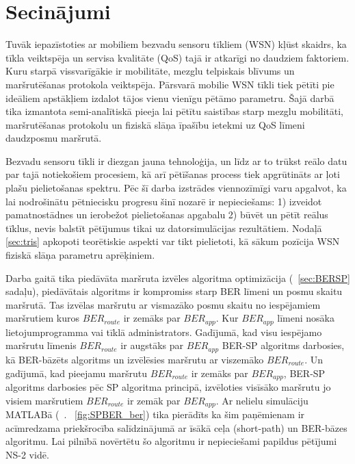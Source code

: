 \chapter{Secinājumi}\label{sec:secin}
Tuvāk iepazīstoties ar mobiliem bezvadu sensoru tīkliem (WSN) kļūst skaidrs, ka tīkla veiktspēja un servisa kvalitāte (QoS) tajā ir atkarīgi no daudziem faktoriem. Kuru starpā vissvarīgākie ir mobilitāte, mezglu telpiskais blīvums un maršrutēšanas protokola veiktspēja. Pārsvarā mobilie WSN tīkli tiek pētīti pie ideāliem apstākļiem izdalot tājos vienu vienīgu pētāmo parametru. Šajā darbā tika izmantota semi-analītiskā pieeja lai pētītu saistības starp mezglu mobilitāti, maršrutēšanas protokolu un fiziskā slāņa īpašību ietekmi uz QoS līmeni daudzposmu maršrutā.

Bezvadu sensoru tīkli ir diezgan jauna tehnoloģija, un līdz ar to trūkst reālo datu par tajā notiekošiem procesiem, kā arī pētīšanas process tiek apgrūtināts ar ļoti plašu pielietošanas spektru. Pēc šī darba izstrādes viennozīmīgi varu apgalvot, ka lai nodrošinātu pētniecisku progresu šinī nozarē ir nepieciešams: 1) izveidot pamatnostādnes un ierobežot pielietošanas apgabalu 2) būvēt un  pētīt reālus tīklus, nevis balstīt pētījumus tikai uz datorsimulācijas rezultātiem. Nodaļā \ref{sec:tris} apkopoti teorētiskie aspekti var tikt pielietoti, kā sākum pozīcija WSN fiziskā slāņa parametru aprēķiniem.

Darba gaitā tika piedāvāta maršruta izvēles algoritma optimizācija (\seename ~\ref{sec:BERSP} sadaļu), piedāvātais algoritms ir kompromiss starp BER līmeni un posmu skaitu maršrutā. Tas izvēlas maršrutu ar vismazāko posmu skaitu no iespējamiem maršrutiem kuros $BER_{route}$ ir zemāks par $BER_{app}$. Kur  $BER_{app}$ līmeni nosāka lietojumprogramma vai tīklā administrators. Gadījumā, kad visu iespējamo maršrutu līmenis $BER_{route}$ ir augstāks par $BER_{app}$ BER-SP algoritms darbosies, kā BER-bāzēts algoritms un izvēlēsies maršrutu ar viszemāko $BER_{route}$. Un gadījumā, kad pieejamu maršrutu $BER_{route}$ ir zemāks par $BER_{app}$, BER-SP algoritms darbosies pēc SP algoritma principā, izvēloties visīsāko maršrutu jo visiem maršrutiem $BER_{route}$ ir zemāk par $BER_{app}$. Ar nelielu simulāciju MATLABā (\seename ~\figurename. ~\ref{fig:SPBER_ber}) tika pierādīts ka šim paņēmienam ir acīmredzama priekšrocība salīdzinājumā ar īsākā ceļa (short-path) un BER-bāzes algoritmu. Lai pilnībā novērtētu šo algoritmu ir nepieciešami papildus pētījumi NS-2 vidē.

